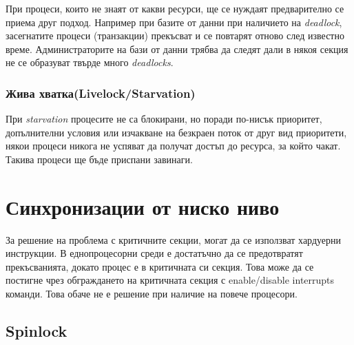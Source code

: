 \documentclass[fleqn,12pt]{article}
\begin{document}
При процеси, които не знаят от какви ресурси, ще се нуждаят предварително се приема друг подход.
Например при базите от данни при наличието на \textit{deadlock}, засегнатите процеси (транзакции) прекъсват и се повтарят отново след известно време.
Администраторите на бази от данни трябва да следят дали в някоя секция не се образуват твърде много \textit{deadlocks}.

\subsubsection{Жива хватка(Livelock/Starvation)}

При \textit{starvation} процесите не са блокирани, но поради по-нисък приоритет, допълнителни условия или изчакване на безкраен поток от друг вид приоритети, някои процеси никога не успяват да получат достъп до ресурса, за който чакат.
Такива процеси ще бъде приспани завинаги.

\section{Синхронизации от ниско ниво}

За решение на проблема с критичните секции, могат да се използват хардуерни инструкции.
В еднопроцесорни среди е достатъчно да се предотвратят прекъсванията, докато процес е в критичната си секция.
Това може да се постигне чрез обграждането на критичната секция с enable/disable interrupts команди.
Това обаче не е решение при наличие на повече процесори.

\subsection{Spinlock}
\end{document}
